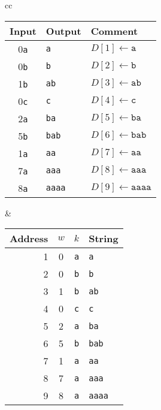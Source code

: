 \begin{tabular}{cc}
  \begin{tabular}{cll}
    Input & Output & Comment \\
    \hline
    0{\tt a} & {\tt          a} & $D[1]\leftarrow\mathtt{a}$\\
    0{\tt b} & {\tt          b} & $D[2]\leftarrow\mathtt{b}$\\
    1{\tt b} & {\tt         ab} & $D[3]\leftarrow\mathtt{ab}$\\
    0{\tt c} & {\tt          c} & $D[4]\leftarrow\mathtt{c}$\\
    2{\tt a} & {\tt         ba} & $D[5]\leftarrow\mathtt{ba}$\\
    5{\tt b} & {\tt        bab} & $D[6]\leftarrow\mathtt{bab}$\\
    1{\tt a} & {\tt         aa} & $D[7]\leftarrow\mathtt{aa}$\\
    7{\tt a} & {\tt        aaa} & $D[8]\leftarrow\mathtt{aaa}$\\
    8{\tt a} & {\tt       aaaa} & $D[9]\leftarrow\mathtt{aaaa}$
  \end{tabular}
  &
  \begin{tabular}{rccl}
    Address & $w$ & $k$ & String \\
    \hline
    1 & 0 & {\tt a} & {\tt a}\\
    2 & 0 & {\tt b} & {\tt b}\\
    3 & 1 & {\tt b} & {\tt ab}\\
    4 & 0 & {\tt c} & {\tt c}\\
    5 & 2 & {\tt a} & {\tt ba}\\
    6 & 5 & {\tt b} & {\tt bab}\\
    7 & 1 & {\tt a} & {\tt aa}\\
    8 & 7 & {\tt a} & {\tt aaa}\\
    9 & 8 & {\tt a} & {\tt aaaa}
  \end{tabular}
\end{tabular}
